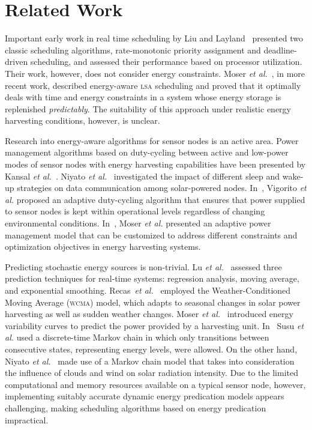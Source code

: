 \section{Related Work} \label{sec:related work}

Important early work in real time scheduling by Liu and Layland~\cite{Liu73} presented two classic scheduling algorithms, rate-monotonic priority assignment and deadline-driven scheduling, 
and assessed their performance based on processor utilization. Their work, however, does not consider energy constraints. 
Moser \emph{et al.}~\cite{moser2007real}, in more recent work, described energy-aware \textsc{lsa} scheduling
and proved that it optimally deals with time and energy constraints in a system whose energy storage is replenished \textit{predictably}. 
The suitability of this approach under realistic energy harvesting conditions, however, is unclear. 

Research into energy-aware algorithms for sensor nodes is an active area. 
Power management algorithms based on duty-cycling between active and low-power modes of sensor nodes 
with energy harvesting capabilities have been 
presented by Kansal \emph{et al.}~\cite{kansal2007power}. 
Niyato \emph{et al.}~\cite{niyato2007sleep} investigated the impact of different sleep and wake-up strategies on data communication
among solar-powered nodes. 
In~\cite{vigorito2007adaptive}, Vigorito \emph{et al.} proposed an adaptive duty-cycling algorithm that ensures 
that power supplied to sensor nodes is kept within operational levels regardless of changing environmental conditions. 
In~\cite{moser2007adaptive}, Moser \emph{et al.} presented an adaptive power management
model that can be customized to address different constraints and optimization objectives in energy harvesting systems.

Predicting stochastic energy sources is non-trivial.  
Lu \emph{et al.}~\cite{lu2010accurate} assessed three prediction techniques for real-time systems: regression analysis,
moving average, and exponential smoothing. Recas~\emph{et al.}~\cite{recas2000hollows} employed the Weather-Conditioned Moving Average (\textsc{wcma}) model, which adapts to seasonal changes in
solar power harvesting as well as sudden weather changes. 
Moser \emph{et al.}~\cite{moser2007real} introduced energy variability curves to predict the power provided by a 
harvesting unit. 
In~\cite{susu2008stochastic} Susu \emph{et al.} used a discrete-time Markov chain in which only transitions between 
consecutive states, representing energy levels, were allowed. 
On the other hand, Niyato \emph{et al.}~\cite{niyato2007sleep} made use of a Markov chain model that takes into consideration the influence of clouds and wind on solar radiation intensity. 
Due to the limited computational and memory resources available on a typical sensor node, however,
implementing suitably accurate dynamic energy predication models appears challenging, making 
scheduling algorithms based on energy predication impractical. 

